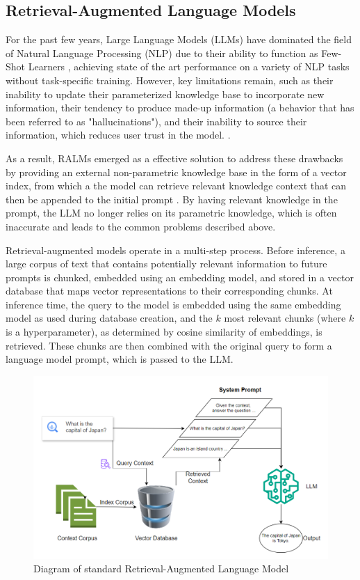 \documentclass[11pt]{article}
\begin{document}
\subsection{Retrieval-Augmented Language Models}
For the past few years, Large Language Models (LLMs) have dominated the field of Natural Language Processing (NLP) due to their ability to function as Few-Shot Learners \cite{brown2020language}, achieving state of the art performance on a variety of NLP tasks without task-specific training. However, key limitations remain, such as their inability to update their parameterized knowledge base to incorporate new information, their tendency to produce made-up information (a behavior that has been referred to as "hallucinations"), and their inability to source their information, which reduces user trust in the model. \cite{lewis2021retrievalaugmented, huang2023survey}. 

As a result, RALMs emerged as a effective solution to address these drawbacks by providing an external non-parametric knowledge base in the form of a vector index, from which a the model can retrieve relevant knowledge context that can then be appended to the initial prompt \cite{lewis2021retrievalaugmented}. By having relevant knowledge in the prompt, the LLM no longer relies on its parametric knowledge, which is often inaccurate and leads to the common problems described above.

Retrieval-augmented models operate in a multi-step process. Before inference, a large corpus of text that contains potentially relevant information to future prompts is chunked, embedded using an embedding model, and stored in a vector database that maps vector representations to their corresponding chunks. At inference time, the query to the model is embedded using the same embedding model as used during database creation, and the $k$ most relevant chunks (where $k$ is a hyperparameter), as determined by cosine similarity of embeddings, is retrieved. These chunks are then combined with the original query to form a language model prompt, which is passed to the LLM. 

\begin{figure}[t]
    \centering
    \includegraphics[width=1\linewidth]{overleaf/rag_diagram.png}
    \caption{Diagram of standard Retrieval-Augmented Language Model}
    \label{fig:enter-label}
\end{figure}
\end{document}
